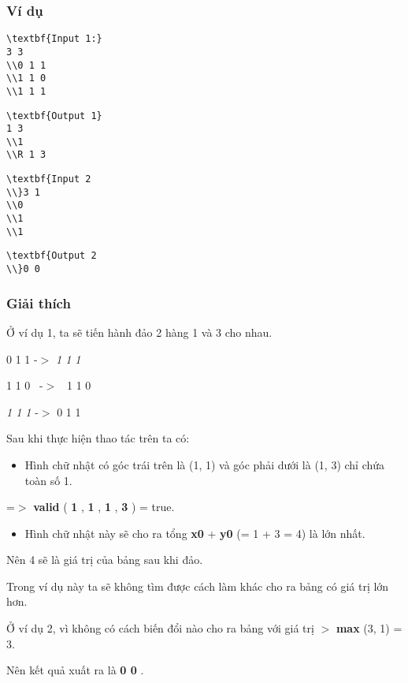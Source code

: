 \subsubsection{   Ví dụ  }
\begin{verbatim}
\textbf{Input 1:}
3 3
\\0 1 1
\\1 1 0
\\1 1 1
\end{verbatim}
\begin{verbatim}
\textbf{Output 1}
1 3
\\1
\\R 1 3
\end{verbatim}
\begin{verbatim}
\textbf{Input 2
\\}3 1
\\0
\\1
\\1\end{verbatim}
\begin{verbatim}
\textbf{Output 2
\\}0 0\end{verbatim}

\subsubsection{   Giải thích  }

   Ở ví dụ 1, ta sẽ tiến hành đảo 2 hàng 1 và 3 cho nhau.  

    0 1 1      -$>$   \emph{    1 1 1   }

   1 1 0  -$>$  1 1 0  

\emph{    1 1 1   }   -$>$       0 1 1   

   Sau khi thực hiện thao tác trên ta có:  
\begin{itemize}
	\item     Hình chữ nhật có góc trái trên là (1, 1) và góc phải dưới là (1, 3) chỉ chứa toàn số 1.   
\end{itemize}

   =$>$   \textbf{    valid   }   (   \textbf{    1   }   ,   \textbf{    1   }   ,   \textbf{    1   }   ,   \textbf{    3   }   ) = true.  
\begin{itemize}
	\item     Hình chữ nhật này sẽ cho ra tổng    \textbf{     x0    }    +    \textbf{     y0    }    (= 1 + 3 = 4) là lớn nhất.   
\end{itemize}

   Nên 4 sẽ là giá trị của bảng sau khi đảo.  

   Trong ví dụ này ta sẽ không tìm được cách làm khác cho ra bảng có giá trị lớn hơn.  

   Ở ví dụ 2, vì không có cách biến đổi nào cho ra bảng với giá trị   \textbf{}\textbf{    $>$   }\textbf{    max   }   (3, 1) = 3.  

   Nên kết quả xuất ra là   \textbf{    0 0   }   .  
